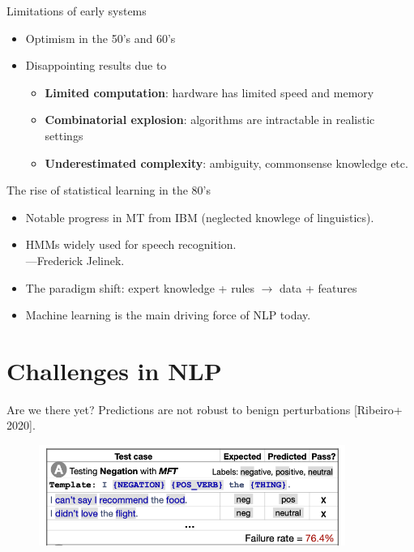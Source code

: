 \documentclass[usenames,dvipsnames,notes,11pt,aspectratio=169]{beamer}
\begin{document}
\begin{frame}
    {Limitations of early systems}
    \begin{itemize}
        \itemsep1em
        \item Optimism in the 50's and 60's\\
        \item Disappointing results due to
            \begin{itemize}
                \item \textbf{Limited computation}: hardware has limited speed and memory 
                \item \textbf{Combinatorial explosion}: algorithms are intractable in realistic settings
                \item \textbf{Underestimated complexity}: ambiguity, commonsense knowledge etc.
            \end{itemize}
    \end{itemize}
\end{frame}

\begin{frame}
    {The rise of statistical learning in the 80's}
    \begin{itemize}
        \itemsep1em
        \item Notable progress in MT from IBM (neglected knowlege of linguistics).
        \item HMMs widely used for speech recognition.\\
            ---Frederick Jelinek.
        \item The paradigm shift: expert knowledge + rules $\rightarrow$ data + features
        \item Machine learning is the main driving force of NLP today.
    \end{itemize}
\end{frame}

\section{Challenges in NLP}
\begin{frame}
    {Are we there yet?}
    Predictions are not robust to benign perturbations [Ribeiro+ 2020].
    \begin{figure}
        \includegraphics[width=10cm]{figures/checklist}
    \end{figure}
\end{frame}
\end{document}
